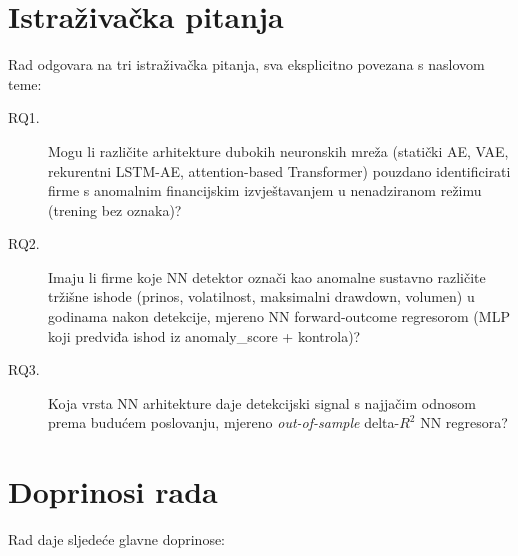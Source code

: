 \documentclass[diplomskirad,authoryear]{fer}
\begin{document}
\section{Istraživačka pitanja}

Rad odgovara na tri istraživačka pitanja, sva eksplicitno povezana s naslovom teme:

\begin{description}
 \item[RQ1.] Mogu li različite arhitekture dubokih neuronskih mreža (statički AE, VAE, rekurentni LSTM-AE, attention-based Transformer) pouzdano identificirati firme s anomalnim financijskim izvještavanjem u nenadziranom režimu (trening bez oznaka)?
 \item[RQ2.] Imaju li firme koje NN detektor označi kao anomalne sustavno različite tržišne ishode (prinos, volatilnost, maksimalni drawdown, volumen) u godinama nakon detekcije, mjereno NN forward-outcome regresorom (MLP koji predviđa ishod iz anomaly\_score + kontrola)?
 \item[RQ3.] Koja vrsta NN arhitekture daje detekcijski signal s najjačim odnosom prema budućem poslovanju, mjereno \emph{out-of-sample} delta-$R^2$ NN regresora?
\end{description}

\section{Doprinosi rada}

Rad daje sljedeće glavne doprinose:
\end{document}
